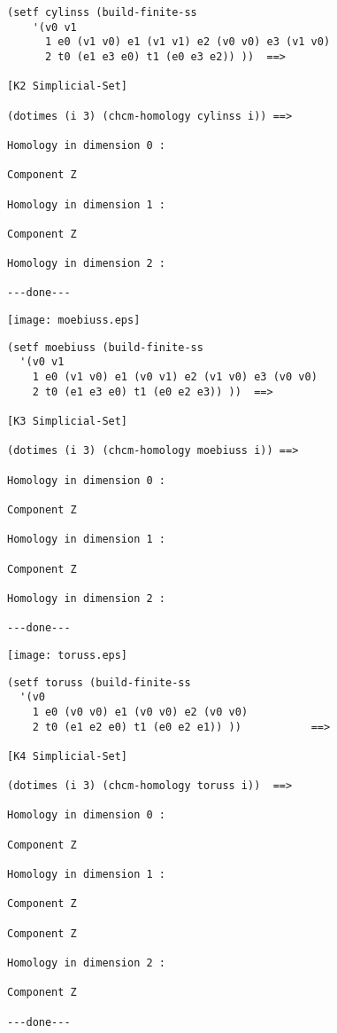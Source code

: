 {\footnotesize\begin{verbatim}
(setf cylinss (build-finite-ss
    '(v0 v1
      1 e0 (v1 v0) e1 (v1 v1) e2 (v0 v0) e3 (v1 v0)
      2 t0 (e1 e3 e0) t1 (e0 e3 e2)) ))  ==>

[K2 Simplicial-Set]

(dotimes (i 3) (chcm-homology cylinss i)) ==>

Homology in dimension 0 :

Component Z

Homology in dimension 1 :

Component Z

Homology in dimension 2 :

---done---
\end{verbatim}}
\newpage
%
\vskip 0.40cm
\centerline{\texttt{[image: moebiuss.eps]}}
\vskip 0.40cm
%
{\footnotesize\begin{verbatim}
(setf moebiuss (build-finite-ss
  '(v0 v1
    1 e0 (v1 v0) e1 (v0 v1) e2 (v1 v0) e3 (v0 v0)
    2 t0 (e1 e3 e0) t1 (e0 e2 e3)) ))  ==>

[K3 Simplicial-Set]

(dotimes (i 3) (chcm-homology moebiuss i)) ==>

Homology in dimension 0 :

Component Z

Homology in dimension 1 :

Component Z

Homology in dimension 2 :

---done---
\end{verbatim}}
\newpage
%
\vskip 0.40cm
\centerline{\texttt{[image: toruss.eps]}}
\vskip 0.40cm
%
{\footnotesize\begin{verbatim}
(setf toruss (build-finite-ss
  '(v0
    1 e0 (v0 v0) e1 (v0 v0) e2 (v0 v0)
    2 t0 (e1 e2 e0) t1 (e0 e2 e1)) ))           ==>

[K4 Simplicial-Set]

(dotimes (i 3) (chcm-homology toruss i))  ==>

Homology in dimension 0 :

Component Z

Homology in dimension 1 :

Component Z

Component Z

Homology in dimension 2 :

Component Z

---done---
\end{verbatim}}
\newpage
%
\vskip 0.40cm
